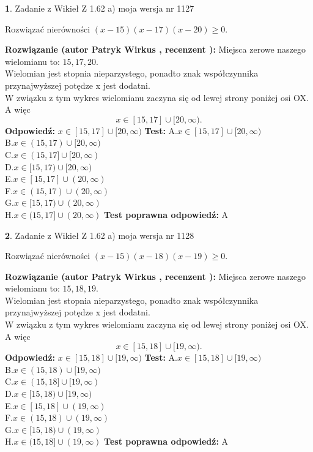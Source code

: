 \documentclass[12pt, a4paper]{article}
\theoremstyle{definition} %
\newtheorem{zad}{}
\newcommand{\zadStart}[1]{\begin{zad}#1\newline}
\newcommand{\zadStop}{\end{zad}}
\newcommand{\rozwStart}[2]{\noindent \textbf{Rozwiązanie (autor #1 , recenzent #2): }\newline}
\newcommand{\rozwStop}{\newline}
\newcommand{\odpStart}{\noindent \textbf{Odpowiedź:}\newline}
\newcommand{\odpStop}{\newline}
\newcommand{\testStart}{\noindent \textbf{Test:}\newline}
\newcommand{\testStop}{\newline}
\newcommand{\kluczStart}{\noindent \textbf{Test poprawna odpowiedź:}\newline}
\newcommand{\kluczStop}{\newline}
\begin{document}
\zadStart{Zadanie z Wikieł Z 1.62 a) moja wersja nr 1127}

Rozwiązać nierówności $(x-15)(x-17)(x-20)\ge0$.
\zadStop
\rozwStart{Patryk Wirkus}{}
Miejsca zerowe naszego wielomianu to: $15, 17, 20$.\\
Wielomian jest stopnia nieparzystego, ponadto znak współczynnika przy\linebreak najwyższej potędze x jest dodatni.\\ W związku z tym wykres wielomianu zaczyna się od lewej strony poniżej osi OX. A więc $$x \in [15,17] \cup [20,\infty).$$
\rozwStop
\odpStart
$x \in [15,17] \cup [20,\infty)$
\odpStop
\testStart
A.$x \in [15,17] \cup [20,\infty)$\\
B.$x \in (15,17) \cup [20,\infty)$\\
C.$x \in (15,17] \cup [20,\infty)$\\
D.$x \in [15,17) \cup [20,\infty)$\\
E.$x \in [15,17] \cup (20,\infty)$\\
F.$x \in (15,17) \cup (20,\infty)$\\
G.$x \in [15,17) \cup (20,\infty)$\\
H.$x \in (15,17] \cup (20,\infty)$
\testStop
\kluczStart
A
\kluczStop



\zadStart{Zadanie z Wikieł Z 1.62 a) moja wersja nr 1128}

Rozwiązać nierówności $(x-15)(x-18)(x-19)\ge0$.
\zadStop
\rozwStart{Patryk Wirkus}{}
Miejsca zerowe naszego wielomianu to: $15, 18, 19$.\\
Wielomian jest stopnia nieparzystego, ponadto znak współczynnika przy\linebreak najwyższej potędze x jest dodatni.\\ W związku z tym wykres wielomianu zaczyna się od lewej strony poniżej osi OX. A więc $$x \in [15,18] \cup [19,\infty).$$
\rozwStop
\odpStart
$x \in [15,18] \cup [19,\infty)$
\odpStop
\testStart
A.$x \in [15,18] \cup [19,\infty)$\\
B.$x \in (15,18) \cup [19,\infty)$\\
C.$x \in (15,18] \cup [19,\infty)$\\
D.$x \in [15,18) \cup [19,\infty)$\\
E.$x \in [15,18] \cup (19,\infty)$\\
F.$x \in (15,18) \cup (19,\infty)$\\
G.$x \in [15,18) \cup (19,\infty)$\\
H.$x \in (15,18] \cup (19,\infty)$
\testStop
\kluczStart
A
\kluczStop
\end{document}
